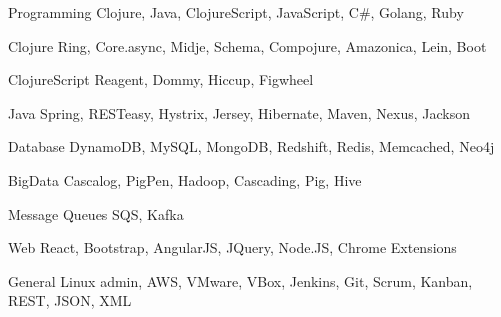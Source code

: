 

\begin{cvskills}

  \cvskill
    {Programming} %
    {Clojure, Java, ClojureScript, JavaScript, C\#, Golang, Ruby} %
    
  \cvskill
    {Clojure} %
    {Ring, Core.async, Midje, Schema, Compojure, Amazonica, Lein, Boot} %
    
  \cvskill
    {ClojureScript} %
    {Reagent, Dommy, Hiccup, Figwheel} %
    
  \cvskill
    {Java} %
    {Spring, RESTeasy, Hystrix, Jersey, Hibernate, Maven, Nexus, Jackson} %

  \cvskill
    {Database} %
    {DynamoDB, MySQL, MongoDB, Redshift, Redis, Memcached, Neo4j} %

  \cvskill
    {BigData} %
    {Cascalog, PigPen, Hadoop, Cascading, Pig, Hive} %
  
  \cvskill
    {Message Queues} %
    {SQS, Kafka} %
    
  \cvskill
    {Web} %
    {React, Bootstrap, AngularJS, JQuery, Node.JS, Chrome Extensions} %
    
   \cvskill
    {General} %
    {Linux admin, AWS, VMware, VBox, Jenkins, Git, Scrum, Kanban, REST, JSON, XML}
\end{cvskills}
